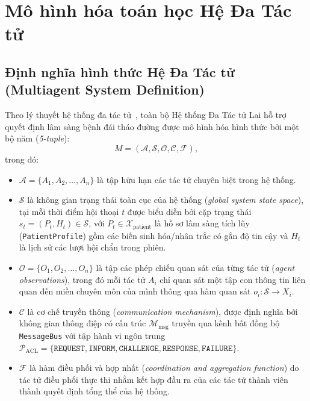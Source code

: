 \chapter{Mô hình hóa toán học Hệ Đa Tác tử}
\label{chap:math}

\section{Định nghĩa hình thức Hệ Đa Tác tử (Multiagent System Definition)}
\label{sec:mas-definition}

Theo lý thuyết hệ thống đa tác tử~\cite{wooldridge2009}, toàn bộ Hệ thống Đa Tác tử Lai hỗ trợ quyết định lâm sàng bệnh đái tháo đường được mô hình hóa hình thức bởi một bộ năm (\emph{5-tuple}):
\begin{equation}
  M = (\mathcal{A}, \mathcal{S}, \mathcal{O}, \mathcal{C}, \mathcal{F}),
  \label{eq:mas-tuple}
\end{equation}
trong đó:
\begin{itemize}
  \item $\mathcal{A} = \{A_1, A_2, \dots, A_n\}$ là tập hữu hạn các tác tử chuyên biệt trong hệ thống.
  \item $\mathcal{S}$ là không gian trạng thái toàn cục của hệ thống (\emph{global system state space}), tại mỗi thời điểm hội thoại $t$ được biểu diễn bởi cặp trạng thái $s_t = (P_t, H_t) \in \mathcal{S}$, với $P_t \in \mathcal{X}_{\text{patient}}$ là hồ sơ lâm sàng tích lũy (\texttt{PatientProfile}) gồm các biến sinh hóa/nhân trắc có gắn độ tin cậy và $H_t$ là lịch sử các lượt hội chẩn trong phiên.
  \item $\mathcal{O} = \{O_1, O_2, \dots, O_n\}$ là tập các phép chiếu quan sát của từng tác tử (\emph{agent observations}), trong đó mỗi tác tử $A_i$ chỉ quan sát một tập con thông tin liên quan đến miền chuyên môn của mình thông qua hàm quan sát $o_i: \mathcal{S} \to X_i$.
  \item $\mathcal{C}$ là cơ chế truyền thông (\emph{communication mechanism}), được định nghĩa bởi không gian thông điệp có cấu trúc $\mathcal{M}_{\text{msg}}$ truyền qua kênh bất đồng bộ \texttt{MessageBus} với tập hành vi ngôn trung $\mathcal{P}_{\text{ACL}} = \{\texttt{REQUEST}, \allowbreak \texttt{INFORM}, \allowbreak \texttt{CHALLENGE}, \allowbreak \texttt{RESPONSE}, \allowbreak \texttt{FAILURE}\}$.
  \item $\mathcal{F}$ là hàm điều phối và hợp nhất (\emph{coordination and aggregation function}) do tác tử điều phối thực thi nhằm kết hợp đầu ra của các tác tử thành viên thành quyết định tổng thể của hệ thống.
\end{itemize}

